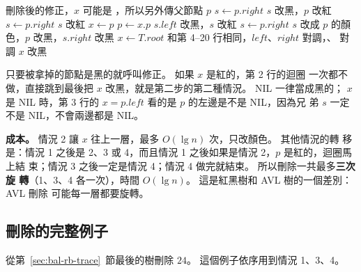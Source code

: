 \begin{pseudo}[label=alg:bal-rb-delfix]{刪除後的修正，$x$ 可能是 \NIL，所以另外傳父節點 $p$}
            \State $s \gets p.\mathit{right}$
             
                \State $s$ 改黑，$p$ 改紅
                \State {}
                \State $s \gets p.\mathit{right}$
            \EndIf
             
                \State $s$ 改紅
                \State $x \gets p$
                \State $p \gets x.p$
            \Else
                 
                    \State $s.\mathit{left}$ 改黑，$s$ 改紅
                    \State {}
                    \State $s \gets p.\mathit{right}$
                \EndIf
                \State $s$ 改成 $p$ 的顏色，$p$ 改黑，$s.\mathit{right}$ 改黑 
                \State {}
                \State $x \gets T.\mathit{root}$
            \EndIf
        \Else
            \State 和第 4--20 行相同，$\mathit{left}$、$\mathit{right}$ 對調，、 對調
        \EndIf
    \EndWhile
        \State $x$ 改黑
    \EndIf
\EndProcedure
\end{pseudo}

 只要被拿掉的節點是黑的就呼叫修正。 如果 $x$ 是紅的，第 2 行的迴圈
一次都不做，直接跳到最後把 $x$ 改黑，就是第二步的第二種情況。 NIL 一律當成黑的；
$x$ 是 NIL 時，第 3 行的 $x = p.\mathit{left}$ 看的是 $p$ 的左邊是不是 NIL，因為兄
弟 $s$ 一定不是 NIL，不會兩邊都是 NIL。

\textbf{成本。} 情況 2 讓 $x$ 往上一層，最多 $O(\lg n)$ 次，只改顏色。 其他情況的轉
移是：情況 1 之後是 2、3 或 4，而且情況 1 之後如果是情況 2，$p$ 是紅的，迴圈馬上結
束；情況 3 之後一定是情況 4；情況 4 做完就結束。 所以刪除一共最多\textbf{三次旋
轉}（1、3、4 各一次），時間 $O(\lg n)$。 這是紅黑樹和 AVL 樹的一個差別：AVL 刪除
可能每一層都要旋轉。

\subsection{刪除的完整例子}
\label{sec:bal-rb-deltrace}

從第~\ref{sec:bal-rb-trace}~節最後的樹刪除 $24$。 這個例子依序用到情況 1、3、4。

